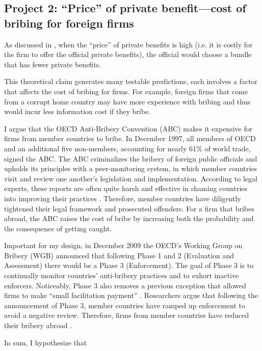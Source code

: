\subsection{Project 2: ``Price'' of private benefit---cost of bribing for foreign firms}
\label{sec:rd_private_benefit}

As discussed in , when the ``price'' of private benefits is high (i.e. it is costly for the firm to offer the official private benefits), the official would choose a bundle that has fewer private benefits.

This theoretical claim generates many testable predictions, each involves a factor that affects the cost of bribing for firms. For example, foreign firms that come from a corrupt home country may have more experience with bribing and thus would incur less information cost if they bribe.

I argue that the OECD Anti-Bribery Convention (ABC) makes it expensive for firms from member countries to bribe. In December 1997, all members of OECD and an additional five non-members, accounting for nearly 61\% of world trade, signed the ABC. The ABC criminalizes the bribery of foreign public officials and upholds its principles with a peer-monitoring system, in which member countries visit and review one another's legislation and implementation. According to legal experts, these reports are often quite harsh and effective in shaming countries into improving their practices \citep{Tyler2011}. Therefore, member countries have diligently tightened their legal framework and prosecuted offenders. For a firm that bribes abroad, the ABC raises the cost of bribe by increasing both the probability and the consequence of getting caught.

Important for my design, in December 2009 the OECD's Working Group on Bribery (WGB) announced that following Phase 1 and 2 (Evaluation and Assessment) there would be a Phase 3 (Enforcement). The goal of Phase 3 is to continually monitor countries' anti-bribery practices and to exhort inactive enforcers. Noticeably, Phase 3 also removes a previous exception that allowed firms to make ``small facilitation payment'' \citep{Strauss2013}. Researchers argue that following the announcement of Phase 3, member countries have ramped up enforcement to avoid a negative review. Therefore, firms from member countries have reduced their bribery abroad \citep{Malesky2015b}. 

In sum, I hypothesize that

